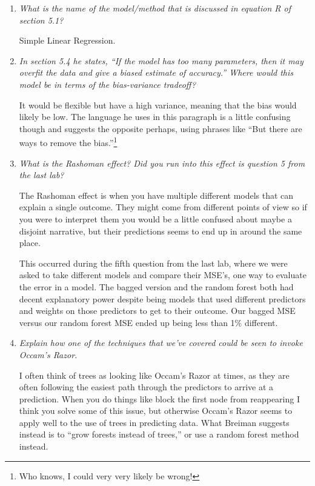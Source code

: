 \documentclass[10pt]{article}
\begin{document}
\begin{enumerate}
	    	\item \textit{What is the name of the model/method that is discussed in equation R of section 5.1?}
		
		Simple Linear Regression.		
		
    	\item \textit{In section 5.4 he states, ``If the model has too many parameters, then it may overfit the data and give a biased estimate of accuracy.'' Where would this model be in terms of the bias-variance tradeoff?}
	
		It would be flexible but have a high variance, meaning that the bias would likely be low. The language he uses in this paragraph is a little confusing though and suggests the opposite perhaps, using phrases like ``But there are ways to remove the bias.''\footnote{Who knows, I could very very likely be wrong!}
	
    	\item \textit{What is the Rashoman effect? Did you run into this effect is question 5 from the last lab?}
	
		The Rashoman effect is when you have multiple different models that can explain a single outcome. They might come from different points of view so if you were to interpret them you would be a little confused about maybe a disjoint narrative, but their predictions seems to end up in around the same place.
		
		This occurred during the fifth question from the last lab, where we were asked to take different models and compare their MSE's, one way to evaluate the error in a model. The bagged version and the random forest both had decent explanatory power despite being models that used different predictors and weights on those predictors to get to their outcome. Our bagged MSE versus our random forest MSE ended up being less than 1\% different.
	
    	\item \textit{Explain how one of the techniques that we've covered could be seen to invoke Occam's Razor.}  
	
	I often think of trees as looking like Occam's Razor at times, as they are often following the easiest path through the predictors to arrive at a prediction. When you do things like block the first node from reappearing I think you solve some of this issue, but otherwise Occam's Razor seems to apply well to the use of trees in predicting data. What Breiman suggests instead is to ``grow forests instead of trees,'' or use a random forest method instead.
    
    \end{enumerate}
\end{document}
